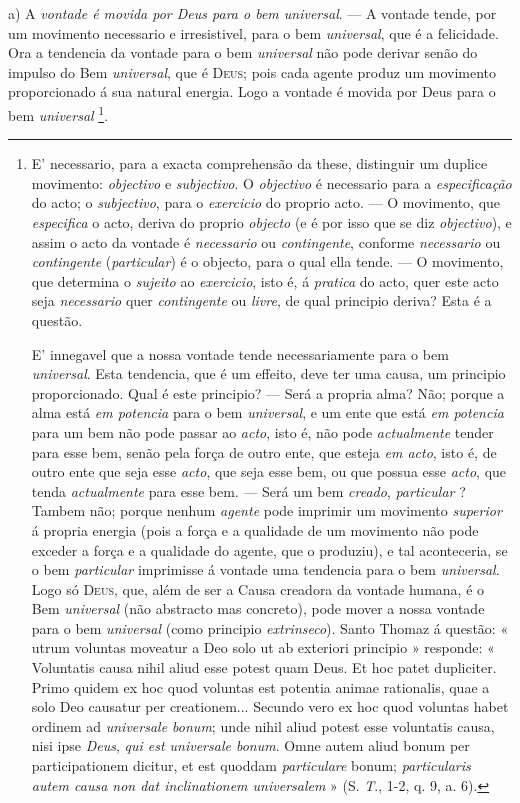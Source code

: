 a) A \emph{vontade é movida por Deus para o bem universal}. ---   A vontade tende, por um movimento necessario e irresistivel, para o bem \emph{universal}, que é a felicidade. Ora a tendencia da   vontade para o bem \emph{universal} não pode derivar senão do impulso do Bem \emph{universal}, que é \textsc{Deus}; pois cada agente produz   um movimento proporcionado á sua natural energia. Logo a vontade é movida por Deus para o bem \emph{universal} \footnote{E' necessario, para a exacta comprehensão da these, distinguir um duplice movimento: \emph{objectivo} e \emph{subjectivo}. O \emph{objectivo} é necessario para a \emph{especificação} do acto; o \emph{subjectivo}, para o \emph{exercicio} do proprio acto. --- O movimento, que \emph{especifica} o acto, deriva do proprio \emph{objecto} (e é por isso que se diz \emph{objectivo}), e assim o acto da vontade é \emph{necessario} ou \emph{contingente}, conforme \emph{necessario} ou \emph{contingente} (\emph{particular}) é o objecto, para o qual ella tende. --- O movimento, que determina o \emph{sujeito} ao \emph{exercicio}, isto é, á \emph{pratica} do acto, quer este acto seja \emph{necessario} quer \emph{contingente} ou \emph{livre}, de qual principio deriva? Esta é a questão.\par E' innegavel que a nossa vontade tende necessariamente para o bem \emph{universal}. Esta tendencia, que é um effeito, deve ter uma causa, um principio proporcionado. Qual é este principio? --- Será a propria alma? Não; porque a alma está \emph{em potencia} para o bem \emph{universal}, e um ente que está \emph{em potencia} para um bem não pode passar ao \emph{acto}, isto é, não pode \emph{actualmente} tender para esse bem, senão pela força de outro ente, que esteja \emph{em acto}, isto é, de outro ente que seja esse \emph{acto}, que seja esse bem, ou que possua esse \emph{acto}, que tenda \emph{actualmente} para esse bem. --- Será um bem \emph{creado}, \emph{particular} ? Tambem não; porque nenhum \emph{agente} pode imprimir um movimento \emph{superior} á propria energia (pois a força e a qualidade de um movimento não pode exceder a força e a qualidade do agente, que o produziu), e tal aconteceria, se o bem \emph{particular} imprimisse á vontade uma tendencia para o bem \emph{universal}. Logo só \textsc{Deus}, que, além de ser a Causa creadora da vontade humana, é o Bem \emph{universal} (não abstracto mas concreto), pode mover a nossa vontade para o bem \emph{universal} (como principio \emph{extrinseco}). Santo Thomaz á questão: « utrum voluntas moveatur a Deo solo ut ab exteriori principio » responde: « Voluntatis causa nihil aliud esse potest quam Deus. Et hoc patet dupliciter. Primo quidem ex hoc quod voluntas est potentia animae rationalis, quae a solo Deo causatur per creationem... Secundo vero ex hoc quod voluntas habet ordinem ad \emph{universale bonum}; unde nihil aliud potest esse voluntatis causa, nisi ipse \emph{Deus}, \emph{qui est universale bonum}. Omne autem aliud bonum per participationem dicitur, et est quoddam \emph{particulare} bonum; \emph{particularis autem causa non dat inclinationem universalem} » (S. \emph{T}., 1-2, q. 9, a. 6).}.

